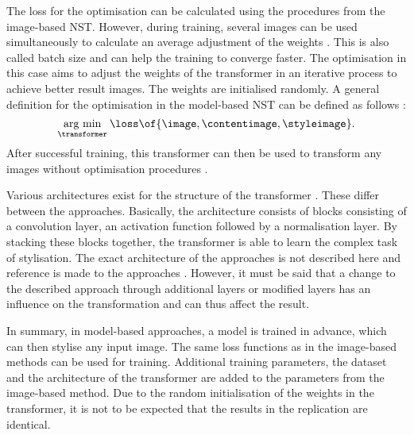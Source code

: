The loss for the optimisation can be calculated using the procedures from the image-based \gls{NST}. However, during training, several images can be used simultaneously to calculate an average adjustment of the weights \cite{Alp2020}. This is also called batch size and can help the training to converge faster. The optimisation in this case aims to adjust the weights of the transformer in an iterative process to achieve better result images. The weights are initialised randomly. A general definition for the optimisation in the model-based \gls{NST} can be defined as follows \cite{JAL2016}:
\begin{equation*}
	\argmin{\transformer}{\loss\of{\image\eqcommasep \contentimage\eqcommasep \styleimage}} \eqtextdot
\end{equation*} 
After successful training, this transformer can then be used to transform any images without optimisation procedures \cite{JAL2016}.

Various architectures exist for the structure of the transformer \transformer{}. These differ between the approaches. Basically, the architecture consists of blocks consisting of a convolution layer, an activation function followed by a normalisation layer. By stacking these blocks together, the transformer is able to learn the complex task of stylisation. The exact architecture of the approaches is not described here and reference is made to the approaches \cite{JAL2016,ULVL2016,UVL2017}. However, it must be said that a change to the described approach through additional layers or modified layers has an influence on the transformation and can thus affect the result.

In summary, in model-based approaches, a model is trained in advance, which can then stylise any input image. The same loss functions as in the image-based methods can be used for training. Additional training parameters, the dataset and the architecture of the transformer are added to the parameters from the image-based method. Due to the random initialisation of the weights in the transformer, it is not to be expected that the results in the replication are identical.